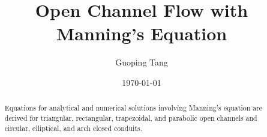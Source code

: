 \documentclass[12pt, a4paper]{article}
\title{Open Channel Flow with Manning's Equation}
\author{Guoping Tang}
\date\today{}
\begin{document}
\maketitle

\begin{abstract}
Equations for analytical and numerical solutions involving Manning's equation are derived for triangular, rectangular, trapezoidal, and parabolic open channels and circular, elliptical, and arch closed conduits.
\end{abstract}













\end{document}

